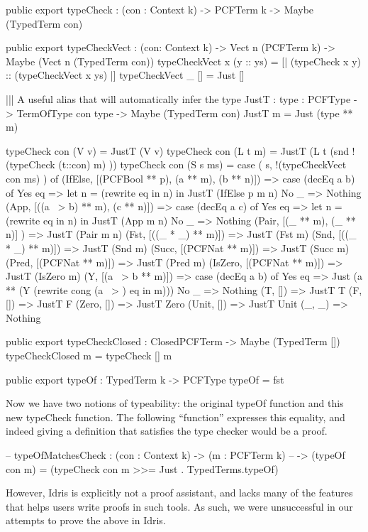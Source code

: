 \begin{code}
public export
typeCheck : (con : Context k) -> PCFTerm k -> Maybe (TypedTerm con)

public export
typeCheckVect : (con: Context k) -> Vect n (PCFTerm k) -> Maybe (Vect n (TypedTerm con))
typeCheckVect x (y :: ys) = [| (typeCheck x y) :: (typeCheckVect x ys) |]
typeCheckVect _ []        = Just []

||| A useful alias that will automatically infer the type
JustT : {type : PCFType} -> TermOfType con type -> Maybe (TypedTerm con)
JustT m = Just (type ** m)

typeCheck con (V v)    = JustT (V v) 
typeCheck con (L t m)  = JustT (L t (snd !(typeCheck (t::con) m) ))
typeCheck con (S s ms) = case ( s,  !(typeCheckVect con ms) ) of
  (IfElse,  [(PCFBool ** p), (a ** m), (b ** n)]) 
      => case (decEq a b) of
            Yes eq => let n = (rewrite eq in n) in JustT (IfElse p m n)
            No  _  => Nothing
  (App,     [((a ~> b) ** m), (c ** n)])
      => case (decEq a c) of
            Yes eq => let n = (rewrite eq in n) in JustT (App m n)
            No  _  => Nothing
  (Pair,    [(_ ** m), (_ ** n)] )  => JustT (Pair m n)
  (Fst,     [((_ * _) ** m)])       => JustT (Fst m)
  (Snd,     [((_ * _) ** m)])       => JustT (Snd m)
  (Succ,    [(PCFNat ** m)])        => JustT (Succ m)
  (Pred,    [(PCFNat ** m)])        => JustT (Pred m)
  (IsZero,  [(PCFNat ** m)])        => JustT (IsZero m)
  (Y,       [(a ~> b ** m)])        => case (decEq a b) of
                                          Yes eq => Just (a ** (Y (rewrite cong (a ~> ) eq in m)))
                                          No  _  => Nothing
  (T,       [])                     => JustT T
  (F,       [])                     => JustT F
  (Zero,    [])                     => JustT Zero
  (Unit,    [])                     => JustT Unit
  (_, _)                            => Nothing
\end{code}

\begin{code}
public export
typeCheckClosed : ClosedPCFTerm -> Maybe (TypedTerm [])
typeCheckClosed m = typeCheck [] m
\end{code}

\begin{code}
public export
typeOf : TypedTerm k -> PCFType
typeOf = fst
\end{code}


Now we have two notions of typeability: the original typeOf function and this new typeCheck function.
The following ``function'' expresses this equality, and indeed giving a definition that satisfies the type checker would be a proof.
\begin{code}
-- typeOfMatchesCheck : (con : Context k) -> (m : PCFTerm k) 
--                        -> (typeOf con m) = (typeCheck con m >>= Just . TypedTerms.typeOf)
\end{code}
However, Idris is explicitly not a proof assistant, and lacks many of the features that helps users write proofs in such tools.
As such, we were unsuccessful in our attempts to prove the above in Idris.